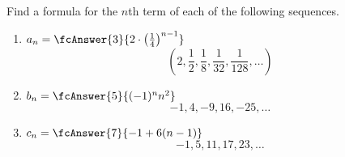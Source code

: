 \begin{frame}
\begin{example}
Find a formula for the $n$th term of each of the following sequences.  
\begin{enumerate}
\item<alert@2-3>  $a_n = \fcAnswer{3}{2\cdot \big(\frac{1}{4}\big)^{n-1}}$
\[
\left( 2, \frac{1}{2},\frac{1}{8},\frac{1}{32}, \frac{1}{128}, \ldots\right)
\]
\item<alert@4-5>  $b_n = \fcAnswer{5}{(-1)^nn^2}$
\[
-1,4,-9,16,-25,\ldots
\]
\item<alert@6-7>  $c_n = \fcAnswer{7}{-1+6(n-1)}$
\[
-1,5,11,17,23,\ldots
\]
\end{enumerate}
\end{example}

\end{frame}
